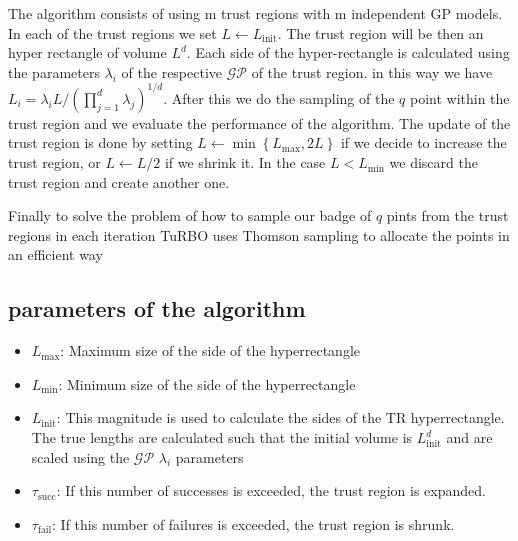 \documentclass[sigconf]{acmart}
\begin{document}
The algorithm consists of using m trust regions with m independent GP models. In each of the trust regions we set $L \longleftarrow L_{\text{init}}$. The trust region will be then an hyper rectangle of volume $L^d$. Each side of the hyper-rectangle is calculated using the parameters $\lambda_i$ of the respective $\mathcal{GP}$ of the trust region. in this way we have $L_i=\lambda_i L /\left(\prod_{j=1}^d \lambda_j\right)^{1 / d}$. After this we do the sampling of the $q$ point within the trust region and we evaluate the performance of the algorithm. The update of the trust region is done by setting $L \leftarrow \min \left\{L_{\max }, 2 L\right\}$ if we decide to increase the trust region, or $L \leftarrow  L/2$ if we shrink it. In the case $L < L_{\min}$ we discard the trust region and create another one. 

Finally to solve the problem of how to sample our badge of $q$ pints from the trust regions in each iteration TuRBO uses Thomson sampling to allocate the points in an efficient way


\subsection{parameters of the algorithm}
\begin{itemize}
    \item $L_{\text{max}}$: Maximum size of the side of the hyperrectangle
    \item $L_{\text{min}}$: Minimum size of the side of the hyperrectangle
    \item $L_{\text{init}}$: This magnitude is used to calculate the sides of the TR hyperrectangle. The true lengths are calculated such that the initial volume is $L_{\text{init}}^d$ and are scaled using the $\mathcal{GP}$ $\lambda_i$ parameters
    \item $\tau_{\text{succ}}$: If this number of successes is exceeded, the trust region is expanded.
    \item $\tau_{\text{fail}}$: If this number of failures is exceeded, the trust region is shrunk.
\end{itemize}
%
%
%
%
\end{document}
